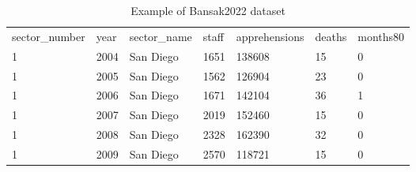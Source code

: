 \begin{table}[h]
\centering
\caption{Example of Bansak2022 dataset}
\label{tab:data_example_bansak}
\begin{tabular}{lllllll}
sector\_number & year & sector\_name & staff & apprehensions & deaths & months80 \\
1              & 2004 & San Diego    & 1651  & 138608        & 15     & 0        \\
1              & 2005 & San Diego    & 1562  & 126904        & 23     & 0        \\
1              & 2006 & San Diego    & 1671  & 142104        & 36     & 1        \\
1              & 2007 & San Diego    & 2019  & 152460        & 15     & 0        \\
1              & 2008 & San Diego    & 2328  & 162390        & 32     & 0        \\
1              & 2009 & San Diego    & 2570  & 118721        & 15     & 0       
\end{tabular}
\end{table}